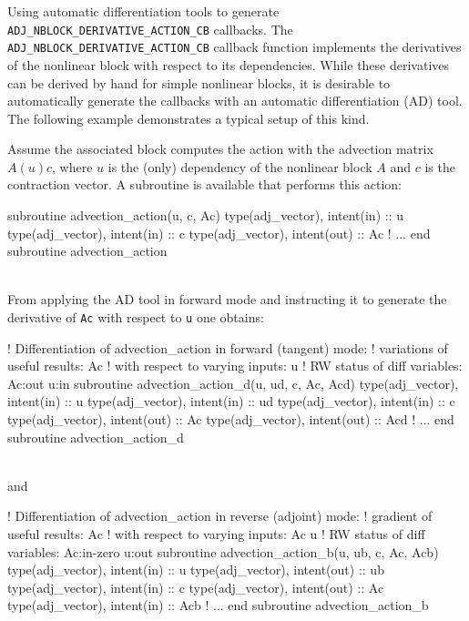 \begin{boxwithtitle}{Using automatic differentiation tools to generate \texttt{ADJ_NBLOCK_DERIVATIVE_ACTION_CB} callbacks.}
The \texttt{ADJ_NBLOCK_DERIVATIVE_ACTION_CB} callback function implements the derivatives of the nonlinear block with respect to its dependencies.
While these derivatives can be derived by hand for simple nonlinear blocks, it is desirable to automatically generate the callbacks with an automatic differentiation (AD) tool.
The following example demonstrates a typical setup of this kind. 


Assume the associated block computes the action with the advection matrix $A(u)c$,
where $u$ is the (only) dependency of the nonlinear block $A$ and $c$ is the contraction vector.
A subroutine is available that performs this action:
\\

\begin{minipage}{\columnwidth}
\begin{fortrancode}
  subroutine advection_action(u, c, Ac)
    type(adj_vector), intent(in) :: u
    type(adj_vector), intent(in) :: c
    type(adj_vector), intent(out) :: Ac
    ! ...
  end subroutine advection_action
\end{fortrancode}
\end{minipage}
\\

From applying the AD tool in forward mode and instructing it to generate the derivative of \texttt{Ac} with respect to \texttt{u} one obtains:
\\

\begin{minipage}{\columnwidth}
\begin{fortrancode}
  ! Differentiation of advection_action in forward (tangent) mode:
  ! variations of useful results: Ac
  ! with respect to varying inputs: u
  ! RW status of diff variables: Ac:out u:in
  subroutine advection_action_d(u, ud, c, Ac, Acd)
    type(adj_vector), intent(in) :: u
    type(adj_vector), intent(in) :: ud
    type(adj_vector), intent(in) :: c
    type(adj_vector), intent(out) :: Ac
    type(adj_vector), intent(out) :: Acd
    ! ...
  end subroutine advection_action_d
\end{fortrancode}
\end{minipage}
\\

and 
\\

\begin{minipage}{\columnwidth}
\begin{fortrancode}
  ! Differentiation of advection_action in reverse (adjoint) mode:
  ! gradient of useful results: Ac
  ! with respect to varying inputs: Ac u
  ! RW status of diff variables: Ac:in-zero u:out
  subroutine advection_action_b(u, ub, c, Ac, Acb)
    type(adj_vector), intent(in) :: u
    type(adj_vector), intent(out) :: ub
    type(adj_vector), intent(in) :: c
    type(adj_vector), intent(out) :: Ac
    type(adj_vector), intent(in) :: Acb
    ! ...
  end subroutine advection_action_b
\end{fortrancode}
\end{minipage}
\\


\end{boxwithtitle}
